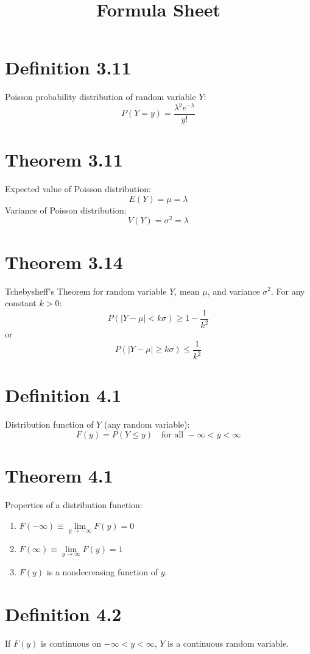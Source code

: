 \documentclass[12pt]{article}
\title{Formula Sheet}
\author{}
\date{}
\begin{document}
\maketitle
\section{Definition 3.11}
Poisson probability distribution of random variable $Y$:
\[
P(Y = y) = \frac{\lambda^y e^{-\lambda}}{y!}
\]

\section{Theorem 3.11}
Expected value of Poisson distribution:
\[
E(Y) = \mu = \lambda
\]
Variance of Poisson distribution:
\[
V(Y) = \sigma^2 = \lambda
\]

\section{Theorem 3.14}
Tchebysheff's Theorem for random variable $Y$, mean $\mu$, and variance $\sigma^2$. For any constant $k > 0$:
\[
P(|Y - \mu| < k\sigma) \geq 1 - \frac{1}{k^2}
\]
or
\[
P(|Y - \mu| \geq k\sigma) \leq \frac{1}{k^2}
\]

\section{Definition 4.1}
Distribution function of $Y$ (any random variable):
\[
F(y) = P(Y \leq y) \quad \text{for all } -\infty < y < \infty
\]

\section{Theorem 4.1}
Properties of a distribution function:
\begin{enumerate}
  \item $F(-\infty) \equiv \lim\limits_{y \to -\infty} F(y) = 0$
  \item $F(\infty) \equiv \lim\limits_{y \to \infty} F(y) = 1$
  \item $F(y)$ is a nondecreasing function of $y$.
\end{enumerate}

\section{Definition 4.2}
If $F(y)$ is continuous on $-\infty < y < \infty$, $Y$ is a continuous random variable.
\end{document}
